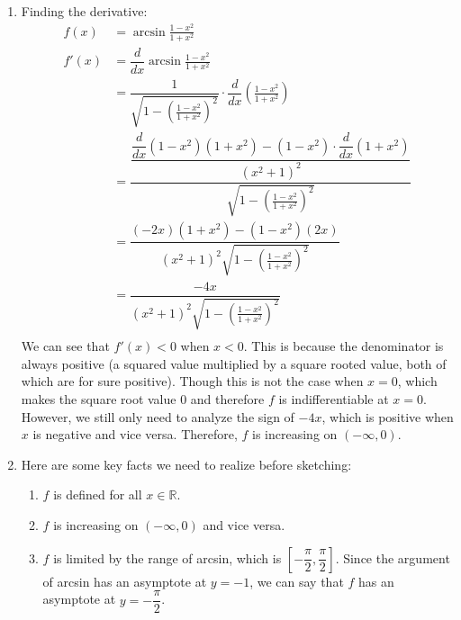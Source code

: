 \documentclass{article}%
\newenvironment{proof}[1][Proof]{\textbf{#1.} }{\ \rule{0.5em}{0.5em}}
\begin{document}
\begin{center}
\begin{enumerate}
\begin{enumerate}
\begin{proof}
        Thus, we have that $\dfrac{1-x^2}{1+x^2} \in [-1, 1]$ for all $x \in \mathbb{R}$. Thus, the domain of $f$ is $\mathbb{R}$.
    \end{proof}
        \item Finding the derivative:
        \begin{align*}
            f(x) &= \arcsin \frac{1-x^2}{1+x^2} \\
            f'(x) &= \dfrac{d}{dx} \arcsin \frac{1-x^2}{1+x^2} \\
            &= \dfrac{1}{\sqrt{1 - \left(\frac{1-x^2}{1+x^2}\right)^2}} \cdot \dfrac{d}{dx} \left(\frac{1-x^2}{1+x^2}\right) \\
            &= \dfrac{\dfrac{\dfrac{d}{dx}(1-x^2)(1+x^2) - (1-x^2)\cdot \dfrac{d}{dx}(1+x^2)}{(x^2+1)^2}}{\sqrt{1 - \left(\frac{1-x^2}{1+x^2}\right)^2}} \\
            &= \dfrac{(-2x)(1+x^2) - (1-x^2)(2x)}{(x^2+1)^2 \sqrt{1 - \left(\frac{1-x^2}{1+x^2}\right)^2}} \\
            &= \boxed{\dfrac{-4x}{(x^2+1)^2 \sqrt{1 - \left(\frac{1-x^2}{1+x^2}\right)^2}}} \\
        \end{align*}
        We can see that $f'(x) < 0$ when $ x < 0$. This is because the denominator is always positive (a squared value multiplied by a square rooted value, both of which are for sure positive). Though this is not the case when $x =0$, which makes the square root value $0$ and therefore $f$ is indifferentiable at $x=0$. However, we still only need to analyze the sign of $-4x$, which is positive when $x$ is negative and vice versa. Therefore, $f$ is increasing on $(-\infty, 0)$.
        \item Here are some key facts we need to realize before sketching:
        \begin{enumerate}
            \item $f$ is defined for all $x \in \mathbb{R}$.
            \item $f$ is increasing on $(-\infty, 0)$ and vice versa.
            \item $f$ is limited by the range of arcsin, which is $\left[-\dfrac{\pi}{2}, \dfrac{\pi}{2}\right]$. Since the argument of arcsin has an asymptote at $y = -1$, we can say that $f$ has an asymptote at $y = -\dfrac{\pi}{2}$.
        \end{enumerate}

\end{enumerate}
\end{enumerate}
\end{center}
\end{document}
